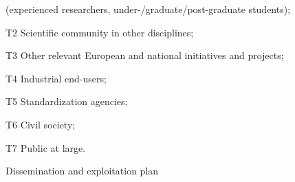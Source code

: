\begin{table}
\begin{compactenum}
     (experienced researchers, under-/graduate/post-graduate students);
\item[T2] Scientific community in other disciplines;
\item[T3] Other relevant European and national initiatives and projects;
\item[T4] Industrial end-users;
\item[T5] Standardization agencies;
\item[T6] Civil society;
\item[T7] Public at large.
\end{compactenum}
\caption{Dissemination and exploitation plan}
\end{table}

%
%
%
%
%
%
%
%
%
%
%
%
%
%
%
%
%
